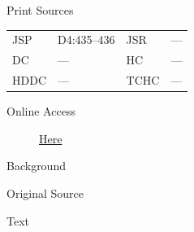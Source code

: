 			\begin{description}
				\item[Print Sources]
			\end{description}

				\begin{tabular}{p{0.5in}p{1in}p{0.5in}p{1in}}
				JSP	 	& D4:435--436		& JSR 		& --- \\
				DC	 	& --- 		& HC 		& --- \\
				HDDC 	& ---		& TCHC 		& --- \\
				\end{tabular}
			
			\begin{description}
				\item[Online Access] \href{https://www.josephsmithpapers.org/paper-summary/blessing-to-william-w-phelps-22-september-1835/1}{Here}
			\end{description}
			
			\begin{description}
				\item[Background]
			\end{description}
			
			
			\begin{description}
				\item[Original Source]
			\end{description}
			
			
			\begin{description}
				\item[Text]
			\end{description}
			
